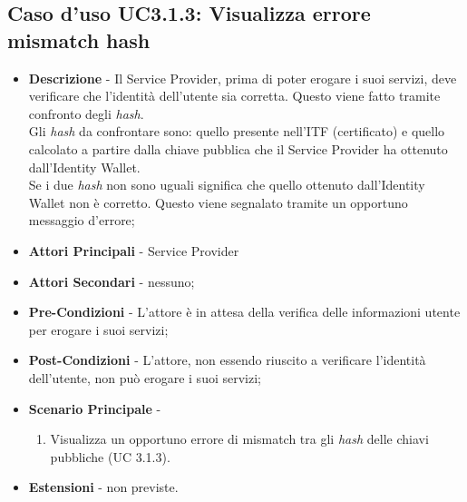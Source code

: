 \subsection{Caso d'uso UC3.1.3: Visualizza errore mismatch hash}
\begin{itemize}
	\item \textbf{Descrizione} - Il Service Provider, prima di poter erogare i suoi servizi, deve verificare che l'identità dell'utente sia corretta. Questo viene fatto tramite confronto degli \textit{hash}.\\
	Gli \textit{hash} da confrontare sono: quello presente nell'\gls{ITF} (certificato) e quello calcolato a partire dalla chiave pubblica che il Service Provider ha ottenuto dall'Identity Wallet.\\
	Se i due \textit{hash} non sono uguali significa che quello ottenuto dall'Identity Wallet non è corretto. Questo viene segnalato tramite un opportuno messaggio d'errore;
	\item \textbf{Attori Principali} - Service Provider
	\item \textbf{Attori Secondari} - nessuno;
	\item \textbf{Pre-Condizioni} - L'attore è in attesa della verifica delle informazioni utente per erogare i suoi servizi;
	\item \textbf{Post-Condizioni} - L'attore, non essendo riuscito a verificare l'identità dell'utente, non può erogare i suoi servizi;
	\item \textbf{Scenario Principale} - 
	\begin{enumerate}
		\item Visualizza un opportuno errore di mismatch tra gli \textit{hash} delle chiavi pubbliche (UC 3.1.3).
	\end{enumerate}
	\item \textbf{Estensioni} - non previste.
\end{itemize}

